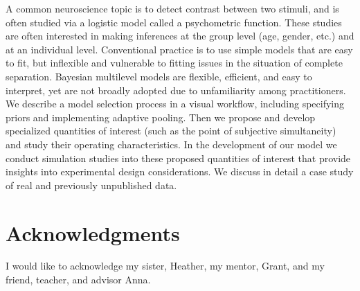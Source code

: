 A common neuroscience topic is to detect contrast between two stimuli, and is often studied via a logistic model called a psychometric function. These studies are often interested in making inferences at the group level (age, gender, etc.) and at an individual level. Conventional practice is to use simple models that are easy to fit, but inflexible and vulnerable to fitting issues in the situation of complete separation. Bayesian multilevel models are flexible, efficient, and easy to interpret, yet are not broadly adopted due to unfamiliarity among practitioners. We describe a model selection process in a visual workflow, including specifying priors and implementing adaptive pooling. Then we propose and develop specialized quantities of interest (such as the point of subjective simultaneity) and study their operating characteristics. In the development of our model we conduct simulation studies into these proposed quantities of interest that provide insights into experimental design considerations. We discuss in detail a case study of real and previously unpublished data.


\newpage
\section*{Acknowledgments}

I would like to acknowledge my sister, Heather, my mentor, Grant, and my friend, teacher, and advisor Anna.


\setcounter{tocdepth}{1}
\tableofcontents

\listoftables

\listoffigures
